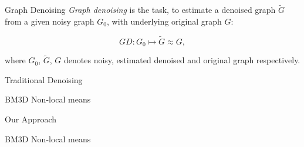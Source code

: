 \begin{frame}[c]{Graph Denoising}
    \textit{Graph denoising} is the task, to estimate a denoised graph $\tilde{G}$  
    from a given noisy graph $G_0$, with underlying original graph $G$:

    \begin{definition}
        $$GD: G_0 \mapsto \tilde{G} \approx G,$$
    \end{definition}
    where $G_0$, $\tilde{G}$, $G$ denotes noisy, estimated denoised and original graph respectively.
\end{frame}

\begin{frame}{Traditional Denoising}

  BM3D
  Non-local means
\end{frame}

\begin{frame}{Our Approach}

  BM3D
  Non-local means
\end{frame}